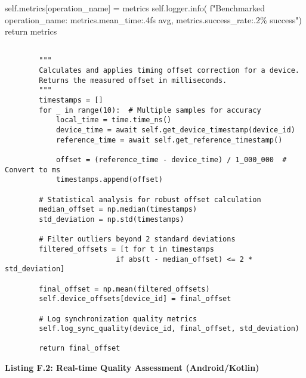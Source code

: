 \documentclass[11pt,a4paper]{report}
\begin{document}
        self.metrics[operation\_name] = metrics
        self.logger.info(
            f"Benchmarked {operation\_name}: {metrics.mean\_time:.4f}s avg, {metrics.success\_rate:.2\%} success")
        return metrics
\begin{verbatim}

        """
        Calculates and applies timing offset correction for a device.
        Returns the measured offset in milliseconds.
        """
        timestamps = []
        for _ in range(10):  # Multiple samples for accuracy
            local_time = time.time_ns()
            device_time = await self.get_device_timestamp(device_id)
            reference_time = await self.get_reference_timestamp()

            offset = (reference_time - device_time) / 1_000_000  # Convert to ms
            timestamps.append(offset)

        # Statistical analysis for robust offset calculation
        median_offset = np.median(timestamps)
        std_deviation = np.std(timestamps)

        # Filter outliers beyond 2 standard deviations
        filtered_offsets = [t for t in timestamps
                          if abs(t - median_offset) <= 2 * std_deviation]

        final_offset = np.mean(filtered_offsets)
        self.device_offsets[device_id] = final_offset

        # Log synchronization quality metrics
        self.log_sync_quality(device_id, final_offset, std_deviation)

        return final_offset

\end{verbatim}

\textbf{Listing F.2: Real-time Quality Assessment (Android/Kotlin)}
\end{document}
